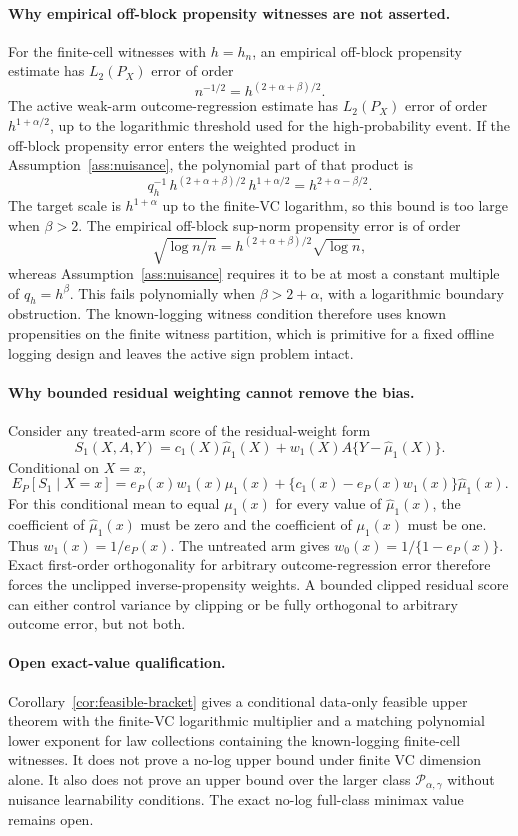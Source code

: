 \documentclass[11pt]{article}
\theoremstyle{definition}
\theoremstyle{plain}
\theoremstyle{remark}
\begin{document}
\paragraph{Why empirical off-block propensity witnesses are not asserted.}
For the finite-cell witnesses with \(h=h_n\), an empirical off-block
propensity estimate has \(L_2(P_X)\) error of order
\[
n^{-1/2}=h^{(2+\alpha+\beta)/2}.
\]
The active weak-arm outcome-regression estimate has \(L_2(P_X)\) error of
order \(h^{1+\alpha/2}\), up to the logarithmic threshold used for the
high-probability event.  If the off-block propensity error enters the
weighted product in Assumption~\ref{ass:nuisance}, the polynomial part of
that product is
\[
q_h^{-1}\,h^{(2+\alpha+\beta)/2}\,h^{1+\alpha/2}
=
h^{2+\alpha-\beta/2}.
\]
The target scale is \(h^{1+\alpha}\) up to the finite-VC logarithm, so this
bound is too large when \(\beta>2\).  The empirical off-block sup-norm
propensity error is of order
\[
\sqrt{\log n/n}
=
h^{(2+\alpha+\beta)/2}\sqrt{\log n},
\]
whereas Assumption~\ref{ass:nuisance} requires it to be at most a constant
multiple of \(q_h=h^\beta\).  This fails polynomially when
\(\beta>2+\alpha\), with a logarithmic boundary obstruction.  The
known-logging witness condition therefore uses known propensities on the
finite witness partition, which is primitive for a fixed offline logging
design and leaves the active sign problem intact.

\paragraph{Why bounded residual weighting cannot remove the bias.}
Consider any treated-arm score of the residual-weight form
\[
S_1(X,A,Y)=c_1(X)\widehat\mu_1(X)+w_1(X)A\{Y-\widehat\mu_1(X)\}.
\]
Conditional on \(X=x\),
\[
E_P[S_1\mid X=x]
=e_P(x)w_1(x)\mu_1(x)
+\{c_1(x)-e_P(x)w_1(x)\}\widehat\mu_1(x).
\]
For this conditional mean to equal \(\mu_1(x)\) for every value of
\(\widehat\mu_1(x)\), the coefficient of \(\widehat\mu_1(x)\) must be zero
and the coefficient of \(\mu_1(x)\) must be one.  Thus
\(w_1(x)=1/e_P(x)\).  The untreated arm gives
\(w_0(x)=1/\{1-e_P(x)\}\).  Exact first-order orthogonality for arbitrary
outcome-regression error therefore forces the unclipped inverse-propensity
weights.  A bounded clipped residual score can either control variance by
clipping or be fully orthogonal to arbitrary outcome error, but not both.

\paragraph{Open exact-value qualification.}
Corollary~\ref{cor:feasible-bracket} gives a conditional data-only feasible
upper theorem with the finite-VC logarithmic multiplier and a matching
polynomial lower exponent for law collections containing the known-logging
finite-cell witnesses.  It does not prove a no-log upper bound under finite
VC dimension alone.  It also does not prove an upper bound over the larger
class \(\mathcal P_{\alpha,\gamma}\) without nuisance learnability
conditions.  The exact no-log full-class minimax value remains open.
\end{document}
